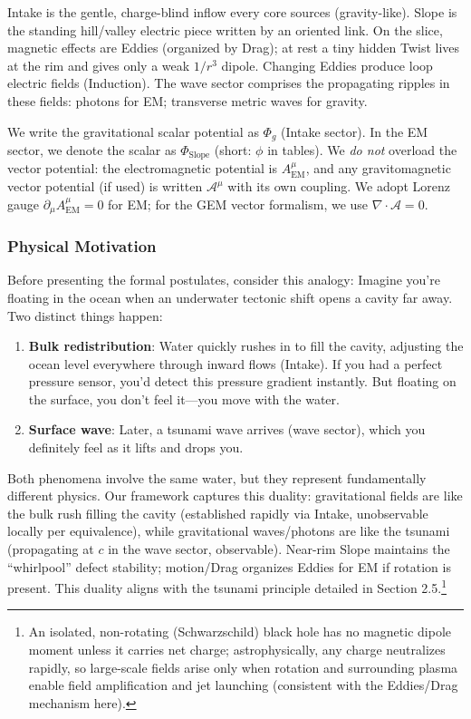 Intake is the gentle, charge-blind inflow every core sources (gravity-like). Slope is the standing hill/valley electric piece written by an oriented link. On the slice, magnetic effects are Eddies (organized by Drag); at rest a tiny hidden Twist lives at the rim and gives only a weak $1/r^3$ dipole. Changing Eddies produce loop electric fields (Induction). The wave sector comprises the propagating ripples in these fields: photons for EM; transverse metric waves for gravity.

We write the gravitational scalar potential as $\Phi_g$ (Intake sector). In the EM sector, we denote the scalar as $\Phi_{\text{Slope}}$ (short: $\phi$ in tables). We \emph{do not} overload the vector potential: the electromagnetic potential is $A^\mu_{\text{EM}}$, and any gravitomagnetic vector potential (if used) is written $\mathcal A^\mu$ with its own coupling. We adopt Lorenz gauge $\partial_\mu A^\mu_{\text{EM}}=0$ for EM; for the GEM vector formalism, we use $\nabla\!\cdot\!\boldsymbol{\mathcal A}=0$.

\subsubsection{Physical Motivation}

Before presenting the formal postulates, consider this analogy: Imagine you're floating in the ocean when an underwater tectonic shift opens a cavity far away. Two distinct things happen:

\begin{enumerate}
\item \textbf{Bulk redistribution}: Water quickly rushes in to fill the cavity, adjusting the ocean level everywhere through inward flows (Intake). If you had a perfect pressure sensor, you'd detect this pressure gradient instantly. But floating on the surface, you don't feel it---you move with the water.
\item \textbf{Surface wave}: Later, a tsunami wave arrives (wave sector), which you definitely feel as it lifts and drops you.
\end{enumerate}

Both phenomena involve the same water, but they represent fundamentally different physics. Our framework captures this duality: gravitational fields are like the bulk rush filling the cavity (established rapidly via Intake, unobservable locally per equivalence), while gravitational waves/photons are like the tsunami (propagating at $c$ in the wave sector, observable). Near-rim Slope maintains the ``whirlpool'' defect stability; motion/Drag organizes Eddies for EM if rotation is present. This duality aligns with the tsunami principle detailed in Section 2.5.\footnote{An isolated, non-rotating (Schwarzschild) black hole has no magnetic dipole moment unless it carries net charge; astrophysically, any charge neutralizes rapidly, so large-scale fields arise only when rotation and surrounding plasma enable field amplification and jet launching (consistent with the Eddies/Drag mechanism here).}

